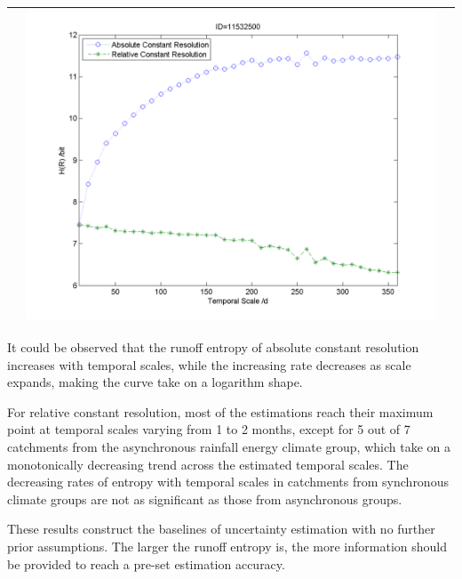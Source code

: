 \documentclass[11pt]{article}
\begin{document}
\begin{table}[H]
{\begin{tabular}{ccc}
&\begin{minipage}{.6\textwidth}\includegraphics[width=\linewidth]{resultgraph/e11532500.png}\end{minipage}
\\
\bottomrule
\end{tabular}
}
\end{table}



It could be observed that the runoff entropy of absolute constant resolution increases with temporal scales, while the increasing rate decreases as scale expands, making the  curve take on a logarithm shape. 

For relative constant resolution, most of the estimations reach their maximum point at temporal scales varying from    
1 to 2 months, except for 5 out of 7 catchments from the asynchronous rainfall energy climate group, which take on a monotonically decreasing trend across the estimated temporal scales. The decreasing rates of entropy with temporal scales in catchments from synchronous climate groups are not as significant as those from asynchronous groups. 

These results construct the baselines of uncertainty estimation with no further prior assumptions. The larger the runoff entropy is, the more information should be provided to reach a pre-set estimation accuracy.

\end{document}

